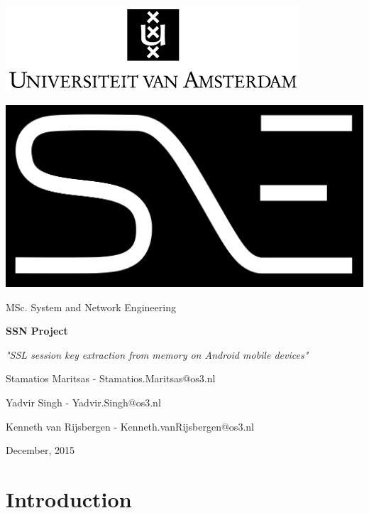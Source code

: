 \documentclass[12pt, a4paper]{report}
\begin{document}
\begin{center}
\includegraphics[scale=0.6]{images/logo-uva.png}
\vspace{30pt}

\includegraphics[scale=0.2]{images/logo-sne_black-inv-flat}
\vspace{10pt}

\Large MSc. System and Network Engineering
\vspace{100pt}

\textbf{\huge SSN Project}
\vspace{10pt}

\textit{\Large "SSL session key extraction from memory on Android mobile devices"}
\vspace{80pt}

\large Stamatios Maritsas - Stamatios.Maritsas@os3.nl

\large Yadvir Singh - Yadvir.Singh@os3.nl

\large Kenneth van Rijsbergen - Kenneth.vanRijsbergen@os3.nl
\vspace{80pt}

\normalsize December, 2015
\end{center}


\tableofcontents


\chapter{Introduction}
\end{document}
